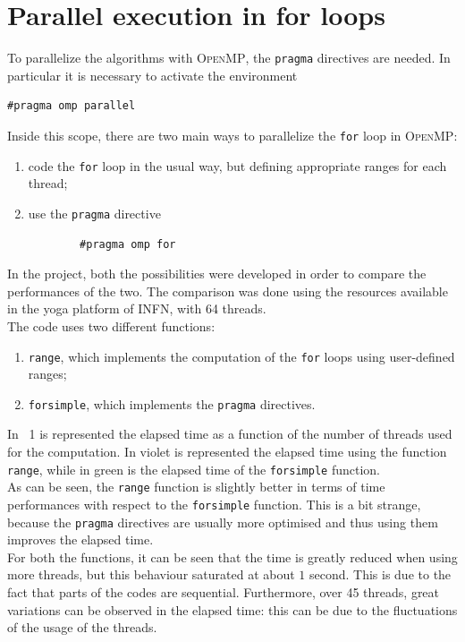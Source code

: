 \documentclass[11pt,a4paper]{article}
\begin{document}
\section{Parallel execution in for loops}
\par To parallelize the algorithms with \textsc{OpenMP}, the \verb+pragma+ directives are needed.
In particular it is necessary to activate the environment
\begin{verbatim}
#pragma omp parallel
\end{verbatim}
Inside this scope, there are two main ways to parallelize the \verb+for+ loop in \textsc{OpenMP}:
\begin{enumerate}
	\item code the \verb+for+ loop in the usual way, but defining appropriate ranges for each thread;
	\item use the \verb+pragma+ directive
		\begin{verbatim}
		#pragma omp for
		\end{verbatim}	 
\end{enumerate}
\par In the project, both the possibilities were developed in order to compare the performances of the two.
The comparison was done using the resources available in the yoga platform of \textsc{INFN}, with 64 threads.\\
The code uses two different functions:
\begin{enumerate}
	\item \verb+range+, which implements the computation of the  \verb+for+ loops using user-defined ranges;
	\item \verb+forsimple+, which implements the \verb+pragma+ directives.
\end{enumerate}
\par In \figurename~1 is represented the elapsed time as a function of the number of threads used for the computation.
In violet is represented the elapsed time using the function \verb+range+, while in green is the elapsed time of the \verb+forsimple+ function.\\
As can be seen, the \verb+range+ function is slightly better in terms of time performances with respect to the \verb+forsimple+ function.
This is a bit strange, because the \verb+pragma+ directives are usually more optimised and thus using them improves the elapsed time.\\
For both the functions, it can be seen that the time is greatly reduced when using more threads, but this behaviour saturated at about $1$ second.
This is due to the fact that parts of the codes are sequential.
Furthermore, over 45 threads, great variations can be observed in the elapsed time: this can be due to the fluctuations of the usage of the threads.
\end{document}
